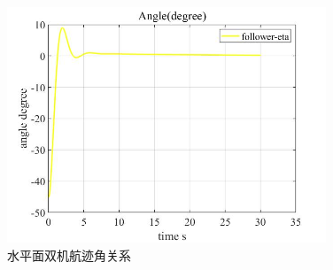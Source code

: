 \begin{figure}[H]
    \centering
    \includegraphics[width=0.85\textwidth]{figures/c5/c5-matlab-eta}
    \caption{水平面双机航迹角关系}\label{fig:c5-matlab-eta}
\end{figure}

